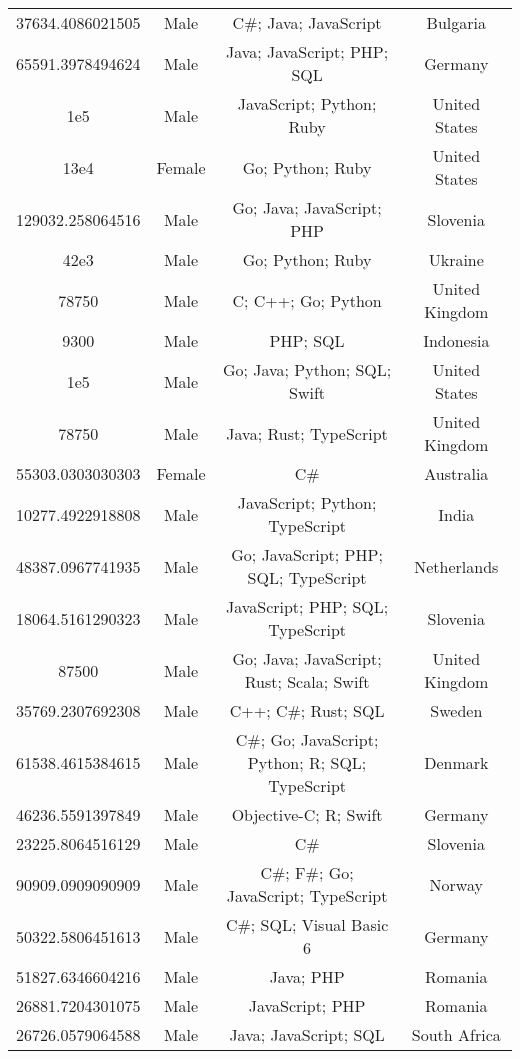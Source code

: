 \begin{center}
\begin{tabular}{ |c|c|c|c| }
37634.4086021505  &  Male  &  C\#; Java; JavaScript  &  Bulgaria  \\ 
65591.3978494624  &  Male  &  Java; JavaScript; PHP; SQL  &  Germany  \\ 
1e5  &  Male  &  JavaScript; Python; Ruby  &  United States  \\ 
13e4  &  Female  &  Go; Python; Ruby  &  United States  \\ 
129032.258064516  &  Male  &  Go; Java; JavaScript; PHP  &  Slovenia  \\ 
42e3  &  Male  &  Go; Python; Ruby  &  Ukraine  \\ 
78750  &  Male  &  C; C++; Go; Python  &  United Kingdom  \\ 
9300  &  Male  &  PHP; SQL  &  Indonesia  \\ 
1e5  &  Male  &  Go; Java; Python; SQL; Swift  &  United States  \\ 
78750  &  Male  &  Java; Rust; TypeScript  &  United Kingdom  \\ 
55303.0303030303  &  Female  &  C\#  &  Australia  \\ 
10277.4922918808  &  Male  &  JavaScript; Python; TypeScript  &  India  \\ 
48387.0967741935  &  Male  &  Go; JavaScript; PHP; SQL; TypeScript  &  Netherlands  \\ 
18064.5161290323  &  Male  &  JavaScript; PHP; SQL; TypeScript  &  Slovenia  \\ 
87500  &  Male  &  Go; Java; JavaScript; Rust; Scala; Swift  &  United Kingdom  \\ 
35769.2307692308  &  Male  &  C++; C\#; Rust; SQL  &  Sweden  \\ 
61538.4615384615  &  Male  &  C\#; Go; JavaScript; Python; R; SQL; TypeScript  &  Denmark  \\ 
46236.5591397849  &  Male  &  Objective-C; R; Swift  &  Germany  \\ 
23225.8064516129  &  Male  &  C\#  &  Slovenia  \\ 
90909.0909090909  &  Male  &  C\#; F\#; Go; JavaScript; TypeScript  &  Norway  \\ 
50322.5806451613  &  Male  &  C\#; SQL; Visual Basic 6  &  Germany  \\ 
51827.6346604216  &  Male  &  Java; PHP  &  Romania  \\ 
26881.7204301075  &  Male  &  JavaScript; PHP  &  Romania  \\ 
26726.0579064588  &  Male  &  Java; JavaScript; SQL  &  South Africa  \\ 

\end{tabular}
\end{center}

